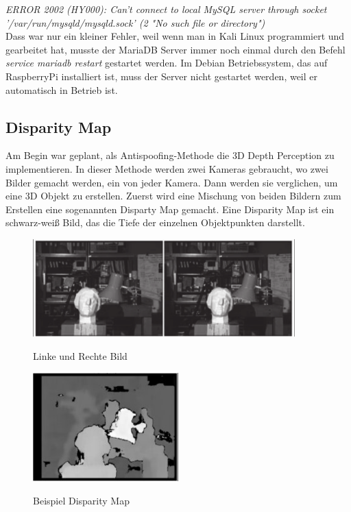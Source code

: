 \bigbreak
\textit{ERROR 2002 (HY000): Can't connect to local MySQL server through socket \\'/var/run/mysqld/mysqld.sock' (2 "No such file or directory")}\\
Dass war nur ein kleiner Fehler, weil wenn man in Kali Linux programmiert und gearbeitet hat, musste der MariaDB Server immer noch einmal durch den Befehl \\ \textit{service mariadb restart} gestartet werden. Im Debian Betriebssystem, das auf RaspberryPi installiert ist, muss der Server nicht gestartet werden, weil er automatisch in Betrieb ist.

\subsection{Disparity Map}
Am Begin war geplant, als Antispoofing-Methode die 3D Depth Perception zu implementieren. In dieser Methode werden zwei Kameras gebraucht, wo zwei Bilder gemacht werden, ein von jeder Kamera. Dann werden sie verglichen, um eine 3D Objekt zu erstellen. Zuerst wird eine Mischung von beiden Bildern zum Erstellen eine sogenannten Disparty Map gemacht. Eine Disparity Map ist ein schwarz-weiß Bild, das die Tiefe der einzelnen Objektpunkten darstellt.
\begin{figure}[ht]
  \centering
    \includegraphics[width=0.9\textwidth]{./figures/disp1.png}
      \caption{Linke und Rechte Bild}
      \cite{disparityM}
\end{figure}
\begin{figure}[ht]
  \centering
    \includegraphics[width=0.5\textwidth]{./figures/disp.png}
      \caption{Beispiel Disparity Map}
      \cite{disparityM}
\end{figure}
